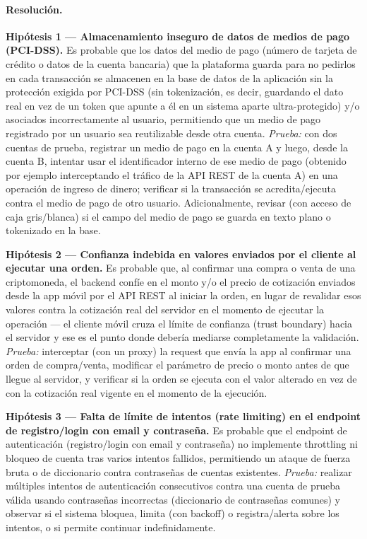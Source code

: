 \paragraph{Resolución.}

\textbf{Hipótesis 1 --- Almacenamiento inseguro de datos de medios de pago (PCI-DSS).}
Es probable que los datos del medio de pago (número de tarjeta de crédito o datos de la
cuenta bancaria) que la plataforma guarda para no pedirlos en cada transacción se
almacenen en la base de datos de la aplicación sin la protección exigida por PCI-DSS
(sin tokenización, es decir, guardando el dato real en vez de un token que apunte a él
en un sistema aparte ultra-protegido) y/o asociados incorrectamente al usuario,
permitiendo que un medio de pago registrado por un usuario sea reutilizable desde otra
cuenta.
\emph{Prueba:} con dos cuentas de prueba, registrar un medio de pago en la cuenta A y
luego, desde la cuenta B, intentar usar el identificador interno de ese medio de pago
(obtenido por ejemplo interceptando el tráfico de la API REST de la cuenta A) en una
operación de ingreso de dinero; verificar si la transacción se acredita/ejecuta contra
el medio de pago de otro usuario. Adicionalmente, revisar (con acceso de caja
gris/blanca) si el campo del medio de pago se guarda en texto plano o tokenizado en la
base.

\textbf{Hipótesis 2 --- Confianza indebida en valores enviados por el cliente al
ejecutar una orden.} Es probable que, al confirmar una compra o venta de una
criptomoneda, el backend confíe en el monto y/o el precio de cotización enviados desde
la app móvil por el API REST al iniciar la orden, en lugar de revalidar esos valores
contra la cotización real del servidor en el momento de ejecutar la operación --- el
cliente móvil cruza el límite de confianza (trust boundary) hacia el servidor y ese es
el punto donde debería mediarse completamente la validación.
\emph{Prueba:} interceptar (con un proxy) la request que envía la app al confirmar una
orden de compra/venta, modificar el parámetro de precio o monto antes de que llegue al
servidor, y verificar si la orden se ejecuta con el valor alterado en vez de con la
cotización real vigente en el momento de la ejecución.

\textbf{Hipótesis 3 --- Falta de límite de intentos (rate limiting) en el endpoint de
registro/login con email y contraseña.} Es probable que el endpoint de autenticación
(registro/login con email y contraseña) no implemente throttling ni bloqueo de cuenta
tras varios intentos fallidos, permitiendo un ataque de fuerza bruta o de diccionario
contra contraseñas de cuentas existentes.
\emph{Prueba:} realizar múltiples intentos de autenticación consecutivos contra una
cuenta de prueba válida usando contraseñas incorrectas (diccionario de contraseñas
comunes) y observar si el sistema bloquea, limita (con backoff) o registra/alerta sobre
los intentos, o si permite continuar indefinidamente.

